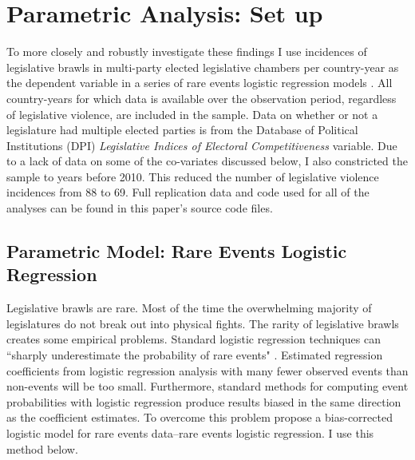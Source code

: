 \documentclass[a4paper]{article}\usepackage[]{graphicx}\usepackage[]{color}
\begin{document}



\section{Parametric Analysis: Set up}

To more closely and robustly investigate these findings I use incidences of legislative brawls in multi-party elected legislative chambers per country-year as the dependent variable in a series of rare events logistic regression models \citep{KingRareEvents2001, KingRareEventsPA2001}. All country-years for which data is available over the observation period, regardless of legislative violence, are included in the sample. Data on whether or not a legislature had multiple elected parties is from the Database of Political Institutions (DPI) \citep[updated to 2010]{DPI2001} {\emph{Legislative Indices of Electoral Competitiveness}} variable. Due to a lack of data on some of the co-variates discussed below, I also constricted the sample to years before 2010. This reduced the number of legislative violence incidences from 88 to 69. Full replication data and code used for all of the analyses can be found in this paper's source code files.

\subsection{Parametric Model: Rare Events Logistic Regression}

Legislative brawls are rare. Most of the time the overwhelming majority of legislatures do not break out into physical fights. The rarity of legislative brawls creates some empirical problems. Standard logistic regression techniques can ``sharply underestimate the probability of rare events" \cite[137]{KingRareEventsPA2001}. Estimated regression coefficients from logistic regression analysis with many fewer observed events than non-events will be too small. Furthermore, standard methods for computing event probabilities with logistic regression produce results biased in the same direction as the coefficient estimates. To overcome this problem \cite{KingRareEventsPA2001} propose a bias-corrected logistic model for rare events data--rare events logistic regression. I use this method below.
\end{document}
